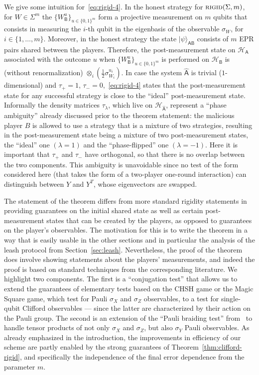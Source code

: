 \documentclass[11pt]{article}
\newcommand{\ket}[1]{|#1\rangle}
\newcommand{\reg}[1]{{\textsf{#1}}}
\newcommand{\mH}{\mathcal{H}}
\newcommand{\rigid}{\textsc{rigid}}
\begin{document}
We give some intuition for~\eqref{eq:rigid-4}. In the honest strategy for $\rigid(\Sigma,m)$, for $W\in \Sigma^m$ the $\{ W_\reg{B}^u\}_{u\in\{0,1\}^m}$ form a projective measurement on $m$ qubits that consists in measuring the $i$-th qubit in the eigenbasis of the observable $\sigma_{W}$, for $i\in\{1,\ldots,m\}$. Moreover, in the honest strategy the state $\ket{\psi}_{\reg{AB}}$ consists of $m$ EPR pairs shared between the players. Therefore, the post-measurement state on $\mH_\reg{A}$ associated with the outcome $u$ when  $\{ W_\reg{B}^u\}_{u\in\{0,1\}^m}$ is performed on $\mH_\reg{B}$ is (without renormalization) $\otimes_i (\frac{1}{2}\sigma_{W_i}^{u_i})$. In case the system $\hat{\reg{A}}$ is trivial ($1$-dimensional) and $\tau_+=1$, $\tau_-=0$,~\eqref{eq:rigid-4}  states that the post-measurement state for any successful strategy is close to the ``ideal'' post-measurement state. Informally the density matrices $\tau_\lambda$, which live on $\mH_{\hat{\reg{A}}}$, represent a ``phase ambiguity'' already discussed prior to the theorem statement: the malicious player $B$ is allowed to use a strategy that is a mixture of two strategies, resulting in the post-measurement state being a mixture of two post-measurement states, the ``ideal'' one $(\lambda=1)$ and the ``phase-flipped'' one $(\lambda=-1)$. Here it is important that $\tau_+$ and $\tau_-$ have orthogonal, so that there is no overlap between the two components. This ambiguity is unavoidable since no test of the form considered here (that takes the form of a two-player one-round interaction) can distinguish between $Y$ and $Y^T$, whose eigenvectors are swapped.  

The statement of the theorem differs from more standard rigidity statements in providing guarantees on the initial shared state as well as certain post-measurement states that can be created by the players, as opposed to guarantees on the player's observables. The motivation for this is to write the theorem in a way that is easily usable in the other sections and in particular the analysis of the leash protocol from Section~\ref{sec:leash}. Nevertheless, the proof of the theorem does involve showing statements about the players' measurements, and indeed the proof is based on standard techniques from the corresponding literature. We highlight two components. The first is a ``conjugation test'' that allows us to extend the guarantees of elementary tests based on the CHSH game or the Magic Square game, which test for Pauli $\sigma_X$ and $\sigma_Z$ observables, to a test for single-qubit Clifford observables --- since the latter are characterized by their action on the Pauli group. The second is an extension of the ``Pauli braiding test'' from~\cite{natarajan2016robust} to handle tensor products of not only $\sigma_X$ and $\sigma_Z$, but also $\sigma_Y$ Pauli observables. As already emphasized in the introduction, the improvements in efficiency of our scheme are partly enabled by the strong guarantees of Theorem~\ref{thm:clifford-rigid}, and specifically the independence of the final error dependence from the parameter $m$. 
\end{document}
